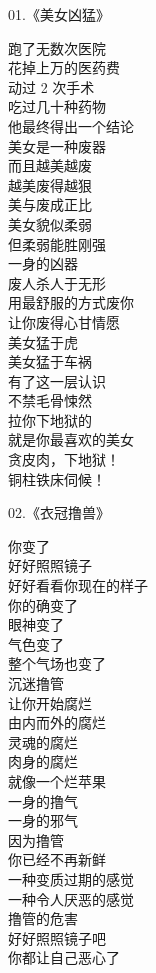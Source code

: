 \begin{multicols}{2}
    \begin{center}
        01.《美女凶猛》\it

        跑了无数次医院 \\ 花掉上万的医药费 \\ 动过 2 次手术 \\ 吃过几十种药物 \\ 他最终得出一个结论 \\ 美女是一种废器 \\ 而且越美越废 \\ 越美废得越狠 \\ 美与废成正比 \\ 美女貌似柔弱 \\ 但柔弱能胜刚强 \\ 一身的凶器 \\ 废人杀人于无形 \\ 用最舒服的方式废你 \\ 让你废得心甘情愿 \\ 美女猛于虎 \\ 美女猛于车祸 \\ 有了这一层认识 \\ 不禁毛骨悚然 \\ 拉你下地狱的 \\ 就是你最喜欢的美女 \\ 贪皮肉，下地狱！ \\ 铜柱铁床伺候！
    \end{center}

    \begin{center}
        02.《衣冠撸兽》\it

        你变了 \\ 好好照照镜子 \\ 好好看看你现在的样子 \\ 你的确变了 \\ 眼神变了 \\ 气色变了 \\ 整个气场也变了 \\ 沉迷撸管 \\ 让你开始腐烂 \\ 由内而外的腐烂 \\ 灵魂的腐烂 \\ 肉身的腐烂 \\ 就像一个烂苹果 \\ 一身的撸气 \\ 一身的邪气 \\ 因为撸管 \\ 你已经不再新鲜 \\ 一种变质过期的感觉 \\ 一种令人厌恶的感觉 \\ 撸管的危害 \\ 好好照照镜子吧 \\ 你都让自己恶心了
    \end{center}


\end{multicols}
